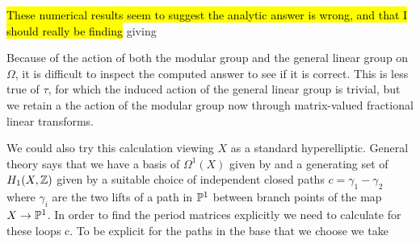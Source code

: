 \documentclass{article}
\begin{document}
\begin{remark}
\hl{These numerical results seem to suggest the analytic answer is wrong, and that I should really be finding}
giving 
\end{remark}


\begin{remark}
	Because of the action of both the modular group and the general linear group on $\Omega$, it is difficult to inspect the computed answer to see if it is correct. This is less true of $\tau$, for which the induced action of the general linear group is trivial, but we retain a the action of the modular group now through matrix-valued fractional linear transforms.  
\end{remark}

\begin{remark}
	We could also try this calculation viewing $X$ as a standard hyperelliptic. General theory says that we have a basis of $\Omega^1(X)$ given by 
	and a generating set of $H_1(X,\mathbb{Z})$ given by a suitable choice of independent closed paths $c = \gamma_1 - \gamma_2$ where $\gamma_i$ are the two lifts of a path in $\mathbb{P}^1$ between branch points of the map $X \to \mathbb{P}^1$. In order to find the period matrices explicitly we need to calculate 
	for these loops c. To be explicit for the paths in the base that we choose we take 
\end{remark}
\end{document}
